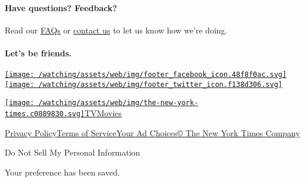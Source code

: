 \hypertarget{have-questions-feedback}{%
\paragraph{Have questions? Feedback?}\label{have-questions-feedback}}

Read our \href{//www.nytimes.com/2017/01/10/watching/faq.html}{FAQs} or
\href{mailto:watchingcare@nytimes.com}{contact us} to let us know how
we're doing.

\hypertarget{lets-be-friends}{%
\paragraph{Let's be friends.}\label{lets-be-friends}}

\href{https://www.facebook.com/nytwatching/}{\texttt{[image: /watching/assets/web/img/footer\_facebook\_icon.48f8f0ac.svg]}}\href{https://twitter.com/watching}{\texttt{[image: /watching/assets/web/img/footer\_twitter\_icon.f138d306.svg]}}

\href{//www.nytimes.com}{\texttt{[image: /watching/assets/web/img/the-new-york-times.c0889830.svg]}}\href{//www.nytimes.com/section/arts/television}{TV}\href{//www.nytimes.com/section/movies}{Movies}

\href{//www.nytimes.com/content/help/rights/privacy/policy/privacy-policy.html}{Privacy
Policy}\href{//www.nytimes.com/content/help/rights/terms/terms-of-service.html}{Terms
of
Service}\href{//www.nytimes.com/content/help/rights/privacy/policy/privacy-policy.html\#pp}{Your
Ad Choices}\href{http://www.nytco.com/}{© The New York Times Company}

Do Not Sell My Personal Information

Your preference has been saved.
